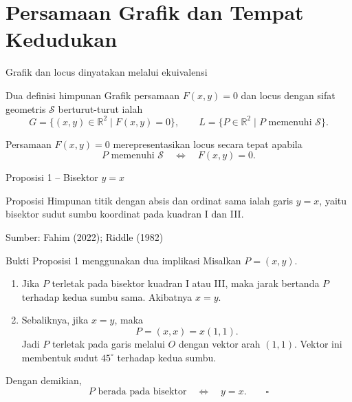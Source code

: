 \documentclass[aspectratio=169,11pt]{beamer}
\newcommand{\source}[1]{%
    \vfill
    \hfill{\tiny\color{gray}Sumber: #1}
}
\newcommand{\axisgrid}[4]{%
    \draw[step=1cm,gray!20,very thin] (#1,#3) grid (#2,#4);
    \draw[-{Latex[length=2mm]},AcademicBlue,thick] (#1,0)--({#2+0.25},0) node[right] {$x$};
    \draw[-{Latex[length=2mm]},AcademicBlue,thick] (0,#3)--(0,{#4+0.25}) node[above] {$y$};
}
\begin{document}
\section{Persamaan Grafik dan Tempat Kedudukan}

\begin{frame}{Grafik dan locus dinyatakan melalui ekuivalensi}
    \begin{block}{Dua definisi himpunan}
        Grafik persamaan $F(x,y)=0$ dan locus dengan sifat geometris
        $\mathcal S$ berturut-turut ialah
        \[
            G=\{(x,y)\in\mathbb R^2\mid F(x,y)=0\},\qquad
            L=\{P\in\mathbb R^2\mid P\text{ memenuhi }\mathcal S\}.
        \]
    \end{block}

    Persamaan $F(x,y)=0$ merepresentasikan locus secara tepat apabila
    \[
        P\text{ memenuhi }\mathcal S
        \quad\Longleftrightarrow\quad F(x,y)=0.
    \]
    
\end{frame}

\begin{frame}{Proposisi 1 -- Bisektor $y=x$}
    \begin{block}{Proposisi}
        Himpunan titik dengan absis dan ordinat sama ialah garis
        $\boxed{y=x}$, yaitu bisektor sudut sumbu koordinat pada kuadran I dan III.
    \end{block}

    \centering
    \source{Fahim (2022); Riddle (1982)}
\end{frame}

\begin{frame}{Bukti Proposisi 1 menggunakan dua implikasi}
    Misalkan $P=(x,y)$.
    \begin{enumerate}
        \item Jika $P$ terletak pada bisektor kuadran I atau III, maka jarak
        bertanda $P$ terhadap kedua sumbu sama. Akibatnya $x=y$.
        \item Sebaliknya, jika $x=y$, maka
        \[
            P=(x,x)=x(1,1).
        \]
        Jadi $P$ terletak pada garis melalui $O$ dengan vektor arah $(1,1)$.
        Vektor ini membentuk sudut $45^\circ$ terhadap kedua sumbu.
    \end{enumerate}

    Dengan demikian,
    \[
        P\text{ berada pada bisektor}
        \quad\Longleftrightarrow\quad y=x.
        \qquad\square
    \]
\end{frame}
\end{document}
